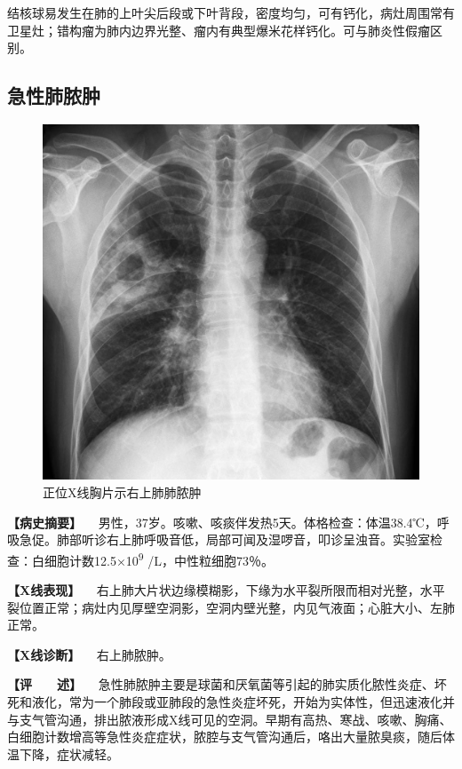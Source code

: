 结核球易发生在肺的上叶尖后段或下叶背段，密度均匀，可有钙化，病灶周围常有卫星灶；错构瘤为肺内边界光整、瘤内有典型爆米花样钙化。可与肺炎性假瘤区别。

\subsection{急性肺脓肿}

\begin{figure}[!htbp]
 \centering
 \includegraphics{./images/Image00152.jpg}
 \captionsetup{justification=centering}
 \caption{正位X线胸片示右上肺肺脓肿}
 \label{fig3-4-4}
  \end{figure} 

\textbf{【病史摘要】}
　男性，37岁。咳嗽、咳痰伴发热5天。体格检查：体温38.4℃，呼吸急促。肺部听诊右上肺呼吸音低，局部可闻及湿啰音，叩诊呈浊音。实验室检查：白细胞计数12.5×10\textsuperscript{9}
/L，中性粒细胞73％。

\textbf{【X线表现】}
　右上肺大片状边缘模糊影，下缘为水平裂所限而相对光整，水平裂位置正常；病灶内见厚壁空洞影，空洞内壁光整，内见气液面；心脏大小、左肺正常。

\textbf{【X线诊断】} 　右上肺脓肿。

\textbf{【评　　述】}
　急性肺脓肿主要是球菌和厌氧菌等引起的肺实质化脓性炎症、坏死和液化，常为一个肺段或亚肺段的急性炎症坏死，开始为实体性，但迅速液化并与支气管沟通，排出脓液形成X线可见的空洞。早期有高热、寒战、咳嗽、胸痛、白细胞计数增高等急性炎症症状，脓腔与支气管沟通后，咯出大量脓臭痰，随后体温下降，症状减轻。

